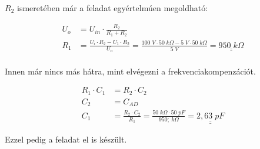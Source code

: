 $R_2$ ismeretében már a feladat egyértelmúen megoldható:

\begin{equation}
\begin{aligned}{}
    U_{o} &= U_{in} \cdot \frac{R_2}{R_1 + R_2} \\
    R_{1} &= \frac{U_i \cdot R_2 - U_1 \cdot R_2}{U_o} = \frac{100\;V \cdot 50\; k\Omega{} - 5\; V \cdot 50\; k\Omega{}}{5 \;V} = \underline{\underline{950 \; k\Omega{}}} \\
\end{aligned}
\end{equation}

Innen már nincs más hátra, mint elvégezni a frekvenciakompenzációt.

\begin{equation}
\begin{aligned}{}
    R_1 \cdot C_1 &=  R_2 \cdot C_2 \\
    C_2 &= C_{AD} \\
    C_1 &= \frac{R_2 \cdot C_2}{R_1} = \frac{50\; k\Omega \cdot 50\; pF}{950;\ k\Omega} = \underline{\underline{2,63\; pF}}
\end{aligned}
\end{equation}

Ezzel pedig a feladat el is készült.


